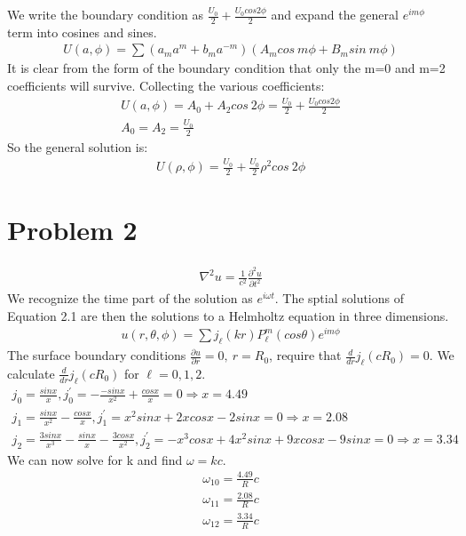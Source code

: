 \documentclass[a4paper,10pt]{article}
\numberwithin{equation}{section}
\begin{document}
We write the boundary condition as $\frac{U_0}{2}+\frac{U_0cos2 \phi}{2}$ and expand the general $e^{im\phi}$ term into cosines and sines.
\begin{gather}
 U(a, \phi)=\sum (a_{m}a^{m}+b_ma^{-m})(A_mcos\ m\phi+B_msin\ m\phi)
\end{gather}
It is clear from the form of the boundary condition that only the m=0 and m=2 coefficients will survive.
Collecting the various coefficients:
\begin{gather}
 U(a, \phi)=A_0 + A_2cos\ 2\phi = \frac{U_0}{2}+\frac{U_0cos2 \phi}{2}\\
 A_0=A_2=\frac{U_0}{2}
\end{gather}
So the general solution is:
\begin{gather}
 U(\rho, \phi)=\frac{U_0}{2}+\frac{U_0}{2}\rho^2cos\ 2\phi
\end{gather}

\section{Problem 2}
\begin{gather}
 \nabla ^2u=\frac{1}{c^2}\frac{\partial ^2u}{\partial t^2}
\end{gather}
We recognize the time part of the solution as $e^{i\omega t}$. 
The sptial solutions of Equation 2.1 are then the solutions to a Helmholtz equation in three dimensions.
\begin{gather}
 u(r, \theta, \phi)=\sum j_{\ell}(kr)P_{\ell}^{m}(cos\theta)e^{im\phi}
\end{gather}
The surface boundary conditions $\frac{\partial u}{\partial r}=0,\ r=R_0$, require that $\frac{d}{dr}j_{\ell}(cR_0)=0$.
We calculate $\frac{d}{dr}j_{\ell}(cR_0)$ for $\ell=0,1,2$.
\begin{gather}
 j_0=\frac{sin x}{x}, j_0^{'}=-\frac{-sin x}{x^2}+\frac{cos x}{x}=0\Rightarrow x=4.49\\
 j_1=\frac{sin x}{x^2}-\frac{cosx}{x}, j_1^{'}=x^2sinx+2xcosx-2sinx=0\Rightarrow x=2.08\\
 j_2=\frac{3sinx}{x^3}-\frac{sinx}{x}-\frac{3cosx}{x^2}, j_2^{'}=-x^3cosx+4x^2sinx+9xcosx-9sinx =0 \Rightarrow x=3.34
\end{gather}
We can now solve for k and find $\omega=kc$.
\begin{gather}
 \omega_{10}=\frac{4.49}{R}c\\
 \omega_{11}=\frac{2.08}{R}c\\
 \omega_{12}=\frac{3.34}{R}c
\end{gather}
\end{document}
